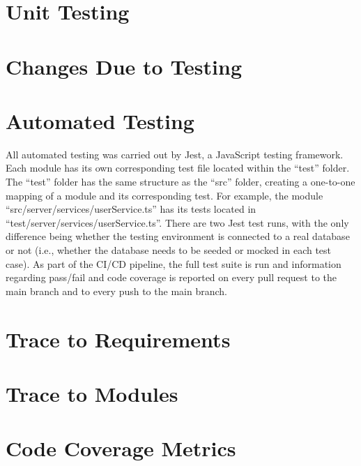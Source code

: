 \documentclass[12pt, titlepage]{article}
\begin{document}
\section{Unit Testing}

\section{Changes Due to Testing}


\section{Automated Testing}

All automated testing was carried out by Jest, a JavaScript testing framework. Each module has its
own corresponding test file located within the ``test'' folder. The ``test'' folder has the same
structure as the ``src'' folder, creating a one-to-one mapping of a module and its corresponding
test. For example, the module ``src/server/services/userService.ts'' has its tests located in
``test/server/services/userService.ts''. There are two Jest test runs, with the only difference
being whether the testing environment is connected to a real database or not (i.e., whether the
database needs to be seeded or mocked in each test case). As part of the CI/CD pipeline, the full
test suite is run and information regarding pass/fail and code coverage is reported on every pull
request to the main branch and to every push to the main branch.

\section{Trace to Requirements}

\section{Trace to Modules}

\section{Code Coverage Metrics}


\end{document}
